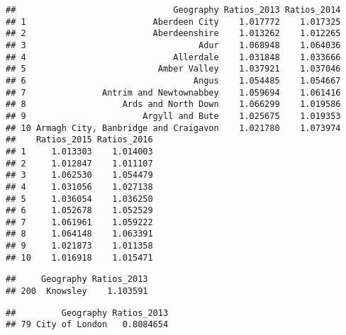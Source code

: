 \documentclass[]{article}
\newenvironment{Shaded}{\begin{snugshade}}{\end{snugshade}}
\newcommand{\KeywordTok}[1]{\textcolor[rgb]{0.13,0.29,0.53}{\textbf{#1}}}
\newcommand{\DecValTok}[1]{\textcolor[rgb]{0.00,0.00,0.81}{#1}}
\newcommand{\CommentTok}[1]{\textcolor[rgb]{0.56,0.35,0.01}{\textit{#1}}}
\newcommand{\OperatorTok}[1]{\textcolor[rgb]{0.81,0.36,0.00}{\textbf{#1}}}
\newcommand{\NormalTok}[1]{#1}
\begin{document}
\begin{verbatim}
##                               Geography Ratios_2013 Ratios_2014
## 1                         Aberdeen City    1.017772    1.017325
## 2                         Aberdeenshire    1.013262    1.012265
## 3                                  Adur    1.068948    1.064036
## 4                             Allerdale    1.031848    1.033666
## 5                          Amber Valley    1.037921    1.037046
## 6                                 Angus    1.054485    1.054667
## 7               Antrim and Newtownabbey    1.059694    1.061416
## 8                   Ards and North Down    1.066299    1.019586
## 9                       Argyll and Bute    1.025675    1.019353
## 10 Armagh City, Banbridge and Craigavon    1.021780    1.073974
##    Ratios_2015 Ratios_2016
## 1     1.013303    1.014003
## 2     1.012847    1.011107
## 3     1.062530    1.054479
## 4     1.031056    1.027138
## 5     1.036054    1.036250
## 6     1.052678    1.052529
## 7     1.061961    1.059222
## 8     1.064148    1.063391
## 9     1.021873    1.011358
## 10    1.016918    1.015471
\end{verbatim}

\begin{Shaded}
\end{Shaded}

\begin{verbatim}
##     Geography Ratios_2013
## 200  Knowsley    1.103591
\end{verbatim}

\begin{Shaded}
\end{Shaded}

\begin{verbatim}
##         Geography Ratios_2013
## 79 City of London   0.8084654
\end{verbatim}
\end{document}
